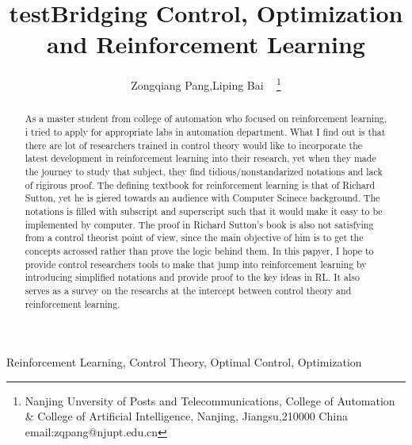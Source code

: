 \documentclass[journal]{IEEEtran}
\begin{document}
    \title{test}
\title{Bridging Control, Optimization and Reinforcement Learning}
\author{ Zongqiang Pang,Liping Bai ~ \thanks{Nanjing Unversity of Posts and Telecommunications, College of Automation \& College of Artificial Intelligence, Nanjing, Jiangsu,210000 China email:zqpang@njupt.edu.cn}}
\maketitle
\begin{abstract}
As a master student from college of automation who focused on reinforcement learning, i tried to apply for appropriate labs in automation department. What I find out is that there are lot of researchers trained in control theory would like to incorporate the latest development in reinforcement learning into their research, yet when they made the journey to study that subject, they find tidious/nonstandarized notations and lack of rigirous proof. The defining textbook for reinforcement learning is that of Richard Sutton, yet he is giered towards an audience with Computer Scinece background. The notations is filled with subscript and superscript such that it would make it easy to be implemented by computer. The proof in Richard Sutton's book is also not satisfying from a control theorist point of view, since the main objective of him is to get the concepts acrossed rather than prove the logic behind them. In this papyer, I hope to provide control researchers tools to make that jump into reinforcement learning by introducing simplified notations and provide proof to the key ideas in RL. It also serves as a survey on the researchs at the intercept between control theory and reinforcement learning.
\end{abstract}
\begin{IEEEkeywords}
Reinforcement Learning, Control Theory, Optimal Control, Optimization
\end{IEEEkeywords}
%
\IEEEpeerreviewmaketitle
\end{document}
